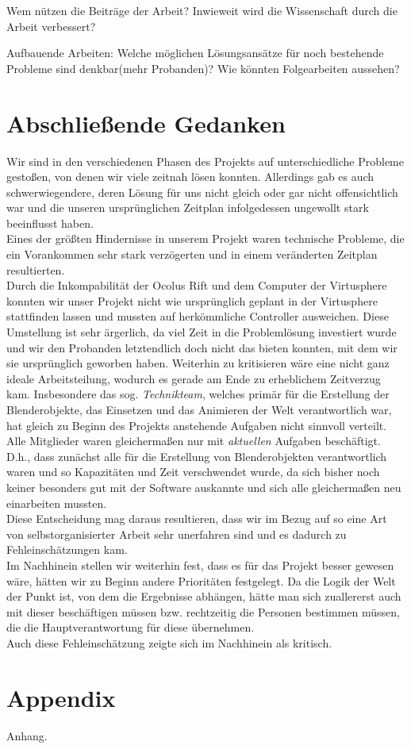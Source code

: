 \documentclass{Bericht}
\begin{document}
	Wem nützen die Beiträge der Arbeit? Inwieweit wird die Wissenschaft durch die Arbeit verbessert?

	Aufbauende Arbeiten: Welche möglichen Lösungsansätze für noch bestehende Probleme sind denkbar(mehr Probanden)? Wie könnten Folgearbeiten aussehen?

\section{Abschließende Gedanken}
	Wir sind in den verschiedenen Phasen des Projekts auf unterschiedliche Probleme gestoßen, von denen wir viele zeitnah lösen konnten. Allerdings gab es auch schwerwiegendere, deren Lösung für uns nicht gleich oder gar nicht offensichtlich war und die unseren ursprünglichen Zeitplan infolgedessen ungewollt stark beeinflusst haben.\\
	Eines der größten Hindernisse in unserem Projekt waren technische Probleme, die ein Vorankommen sehr stark verzögerten und in einem veränderten Zeitplan resultierten.\\
	Durch die Inkompabilität der Ocolus Rift und dem Computer der Virtusphere konnten wir unser Projekt nicht wie ursprünglich geplant in der Virtusphere stattfinden lassen und mussten auf herkömmliche Controller ausweichen. Diese Umstellung ist sehr ärgerlich, da viel Zeit in die Problemlösung investiert wurde und wir den Probanden letztendlich doch nicht das bieten konnten, mit dem wir sie ursprünglich geworben haben. 
	Weiterhin zu kritisieren wäre eine nicht ganz ideale Arbeitsteilung, wodurch es gerade am Ende zu erheblichem Zeitverzug kam. Insbesondere das sog. \textit{Technikteam}, welches primär für die Erstellung der Blenderobjekte, das Einsetzen und das Animieren der Welt verantwortlich war, hat gleich zu Beginn des Projekts anstehende Aufgaben nicht sinnvoll verteilt. Alle Mitglieder waren gleichermaßen nur mit \textit{aktuellen} Aufgaben beschäftigt. D.h., dass zunächst alle für die Erstellung von Blenderobjekten verantwortlich waren und so Kapazitäten und Zeit verschwendet wurde, da sich bisher noch keiner besonders gut mit der Software auskannte und sich alle gleichermaßen neu einarbeiten mussten.\\
	Diese Entscheidung mag daraus resultieren, dass wir im Bezug auf so eine Art von selbstorganisierter Arbeit sehr unerfahren sind und es dadurch zu Fehleinschätzungen kam.\\
	Im Nachhinein stellen wir weiterhin fest, dass es für das Projekt besser gewesen wäre, hätten wir zu Beginn andere Prioritäten festgelegt. Da die Logik der Welt der Punkt ist, von dem die Ergebnisse abhängen, hätte man sich zuallererst auch mit dieser beschäftigen müssen bzw. rechtzeitig die Personen bestimmen müssen, die die Hauptverantwortung für diese übernehmen.\\
	Auch diese Fehleinschätzung zeigte sich im Nachhinein als kritisch.

\section{Appendix} %
	Anhang.
	
\vfill %

\printbibliography
\end{document}
